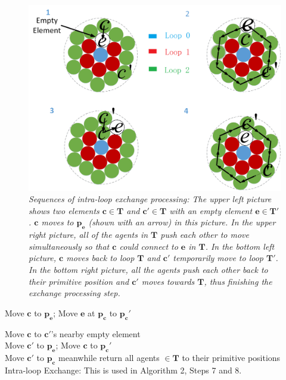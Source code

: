 \begin{figure}[!ht]
\centering
\includegraphics[width=0.7\linewidth]{figs/IntraMovement}
\caption{\em Sequences of intra-loop exchange processing: The upper left picture shows two elements $\mathbf{c} \in \mathbf{T}$ and $\mathbf{c'} \in \mathbf{T}$ with an empty element $\mathbf{e} \in \mathbf{T'}$. $\mathbf{c}$ moves to $\mathbf{p_e}$ (shown with an arrow) in this picture. In the upper right picture, all of the agents in $\mathbf{T}$ push each other to move simultaneously so that $\mathbf{c}$ could connect to $\mathbf{e}$ in $\mathbf{T}$. In the bottom left picture, $\mathbf{c}$ moves back to loop $\mathbf{T}$ and  $\mathbf{c'}$ temporarily move to loop $\mathbf{T'}$. In the bottom right picture, all the agents push each other back to their primitive position and  $\mathbf{c'}$ moves towards $\mathbf{T}$, thus finishing the exchange processing step.
}
\label{fig:intra}
\vspace*{-0.2in}
\end{figure}


\begin{algorithm}[!th]
  \BlankLine
  Move $\mathbf{c}$ to $\mathbf{p_e}$;   Move $\mathbf{e}$ at $\mathbf{p_c}$ to $\mathbf{p_c'}$
  
  Move $\mathbf{c}$ to $\mathbf{c'}$'s nearby empty element\\
  
  Move $\mathbf{c'}$ to $\mathbf{p_e}$;  Move $\mathbf{c}$ to $\mathbf{p_c'}$ \\
  
  Move $\mathbf{c'}$ to $\mathbf{p_c}$ meanwhile return all agents $\in \mathbf{T}$ to their primitive positions\\
  
  \caption{Intra-loop Exchange: This is used in Algorithm 2, Steps 7 and 8.}
  \label{algo:intraloop}
\end{algorithm}


